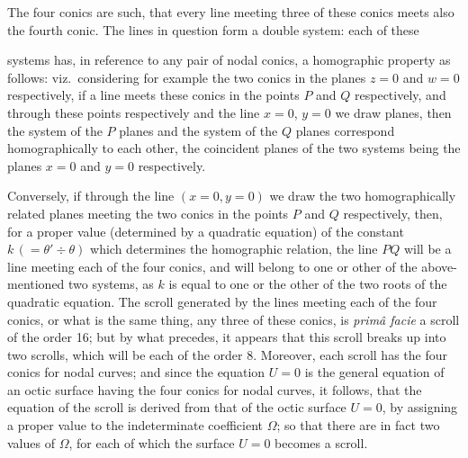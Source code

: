 \documentclass[11pt,a4paper]{article}
\begin{document}
The four conics are such, that every line meeting three of these conics meets also the fourth conic. The lines in question form a double system: each of these

\newpage


systems has, in reference to any pair of nodal conics, a homographic property as follows: viz.\ considering for example the two conics in the planes $z = 0$ and $w = 0$ respectively, if a line meets these conics in the points $P$ and $Q$ respectively, and through these points respectively and the line $x = 0$, $y = 0$ we draw planes, then the system of the $P$ planes and the system of the $Q$ planes correspond homographically to each other, the coincident planes of the two systems being the planes $x = 0$ and $y = 0$ respectively.

Conversely, if through the line $(x = 0, y = 0)$ we draw the two homographically related planes meeting the two conics in the points $P$ and $Q$ respectively, then, for a proper value (determined by a quadratic equation) of the constant $k\,(= \theta' \div \theta)$ which determines the homographic relation, the line $PQ$ will be a line meeting each of the four conics, and will belong to one or other of the above-mentioned two systems, as $k$ is equal to one or the other of the two roots of the quadratic equation. The scroll generated by the lines meeting each of the four conics, or what is the same thing, any three of these conics, is \emph{prim\^a facie} a scroll of the order 16; but by what precedes, it appears that this scroll breaks up into two scrolls, which will be each of the order 8. Moreover, each scroll has the four conics for nodal curves; and since the equation $U = 0$ is the general equation of an octic surface having the four conics for nodal curves, it follows, that the equation of the scroll is derived from that of the octic surface $U = 0$, by assigning a proper value to the indeterminate coefficient $\Omega$; so that there are in fact two values of $\Omega$, for each of which the surface $U = 0$ becomes a scroll.
\end{document}
